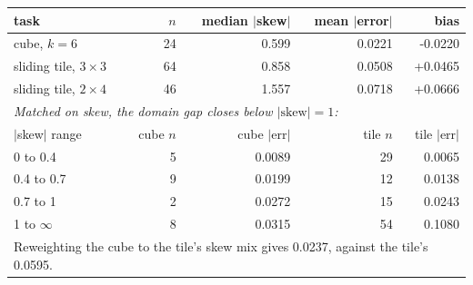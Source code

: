 \begin{tabular}{lrrrr}
\toprule
task & $n$ & median $|$skew$|$ & mean $|$error$|$ & bias \\
\midrule
cube, $k\!=\!6$ & 24 & 0.599 & 0.0221 & -0.0220 \\
sliding tile, $3\times3$ & 64 & 0.858 & 0.0508 & +0.0465 \\
sliding tile, $2\times4$ & 46 & 1.557 & 0.0718 & +0.0666 \\
\midrule
\multicolumn{5}{l}{\emph{Matched on skew, the domain gap closes below $|\mathrm{skew}| = 1$:}} \\
$|$skew$|$ range & cube $n$ & cube $|$err$|$ & tile $n$ & tile $|$err$|$ \\
0 to 0.4 & 5 & 0.0089 & 29 & 0.0065 \\
0.4 to 0.7 & 9 & 0.0199 & 12 & 0.0138 \\
0.7 to 1 & 2 & 0.0272 & 15 & 0.0243 \\
1 to $\infty$ & 8 & 0.0315 & 54 & 0.1080 \\
\midrule
\multicolumn{5}{l}{Reweighting the cube to the tile's skew mix gives 0.0237, against the tile's 0.0595.} \\
\bottomrule
\end{tabular}